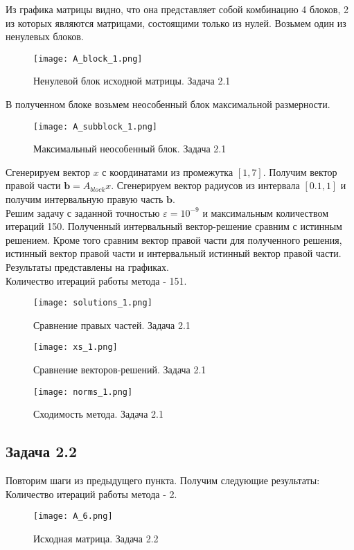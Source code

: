 Из графика матрицы видно, что она представляет собой комбинацию 4 блоков, 2 из которых являются матрицами, состоящими только из нулей. Возьмем один из ненулевых блоков. \\

\begin{figure}[h]
	\centering
	\texttt{[image: A\_block\_1.png]}
	\caption{Ненулевой блок исходной матрицы. Задача 2.1}
\end{figure}

В полученном блоке возьмем неособенный блок максимальной размерности. \\
\newpage
\begin{figure}[h]
	\centering
	\texttt{[image: A\_subblock\_1.png]}
	\caption{Максимальный неособенный блок. Задача 2.1}
\end{figure}

Сгенерируем вектор $x$ с координатами из промежутка $ [1, 7]$. Получим вектор правой части $\textbf{b}=A_{block} x$. Сгенерируем вектор радиусов из интервала $[0.1, 1]$ и получим интервальную правую часть $\textbf{b}$. \\

Решим задачу с заданной точностью $\varepsilon=10^{-9}$ и максимальным количеством итераций 150. Полученный интервальный вектор-решение сравним с истинным решением. Кроме того сравним вектор правой части для полученного решения, истинный вектор правой части и интервальный истинный вектор правой части. Результаты представлены на графиках. \\
Количество итераций работы метода - 151. \\

\begin{figure}[h]
	\centering
	\texttt{[image: solutions\_1.png]}
	\caption{Сравнение правых частей. Задача 2.1}
\end{figure}
\newpage
\begin{figure}[h]
	\centering
	\texttt{[image: xs\_1.png]}
	\caption{Сравнение векторов-решений. Задача 2.1}
\end{figure}

\begin{figure}[h]
	\centering
	\texttt{[image: norms\_1.png]}
	\caption{Сходимость метода. Задача 2.1}
\end{figure}

\subsection{Задача 2.2}
Повторим шаги из предыдущего пункта. Получим следующие результаты: \\
Количество итераций работы метода - 2.
\newpage
\begin{figure}[h]
	\centering
	\texttt{[image: A\_6.png]}
	\caption{Исходная матрица. Задача 2.2}
\end{figure}

